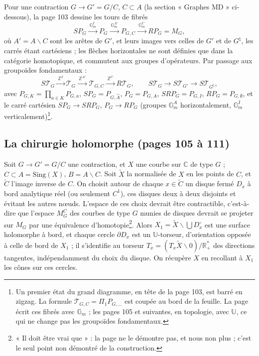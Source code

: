 \documentclass[11pt,a4paper]{article}
\begin{document}
Pour une contraction $G \to G' = G/C$, $C \subset A$ (la section « Graphes
MD » ci-dessous), la page 103 dessine les tours de fibrés
\[
SP_G \xrightarrow{\ \mathbb{G}_m^{I}\ } P_G \xrightarrow{\ \mathbb{G}_m^{A'}\ }
P_{G,C} \xrightarrow{\ \mathbb{G}_m^{C}\ } RP_G = M_G,
\]
où $A' = A \smallsetminus C$ sont les arêtes de $G'$, et leurs images vers
celles de $G'$ et de $G^{\natural}$, les carrés étant cartésiens ; les flèches
horizontales ne sont définies que dans la catégorie homotopique, et commutent
aux groupes d'opérateurs. Par passage aux groupoïdes fondamentaux :
\[
S\mathcal{T}_G \xrightarrow{\ \mathbb{Z}^{I}\ } \mathcal{T}_G
\xrightarrow{\ \mathbb{Z}^{A'}\ } \mathcal{T}_{G,C} \xrightarrow{\
\mathbb{Z}^{C}\ } R\mathcal{T}_G, \qquad S\mathcal{T}_G \to S\mathcal{T}_{G'}
\to S\mathcal{T}_{G^\natural},
\]
avec $P_{G,K} = \prod_{a \in K} P_{G,a}$, $SP_G = P_{G,\hat A}$, $P_G =
P_{G,A}$, $SRP_G = P_{G,I}$, $RP_G = P_{G,\emptyset}$, et le carré cartésien
$SP_G \to SRP_G$, $P_G \to RP_G$ (groupes $\mathbb{G}_m^{A}$ horizontalement,
$\mathbb{G}_m^{I}$ verticalement)\footnote{Un premier état du grand diagramme,
en tête de la page 103, est barré en zigzag. La formule
$\mathcal{T}_{G,C} = \Pi_1 P_{G,\ldots}$ est coupée au bord de la feuille. La
page écrit ces fibrés avec $\mathbb{G}_m$ ; les pages 105 et suivantes, en
topologie, avec $\mathbb{U}$, ce qui ne change pas les groupoïdes
fondamentaux.}.

\subsection*{La chirurgie holomorphe (pages 105 à 111)}

Soit $G \to G' = G/C$ une contraction, et $X$ une courbe sur $\mathbb{C}$ de
type $G$ ; $C \subset A = \mathrm{Sing}(X)$, $B = A \smallsetminus C$. Soit
$\widetilde{X}$ la normalisée de $X$ en les points de $C$, et $\widetilde{C}$
l'image inverse de $C$. On choisit autour de chaque $x \in \widetilde{C}$ un
disque fermé $D_x$ à bord analytique réel (ou seulement $C^1$), ces disques
deux à deux disjoints et évitant les autres nœuds. L'espace de ces choix
devrait être contractible, c'est-à-dire que l'espace $M^C_G$ des courbes de
type $G$ munies de disques devrait se projeter sur $M_G$ par une équivalence
d'homotopie\footnote{« Il doit être vrai que » : la page ne le démontre pas,
et nous non plus ; c'est le seul point non démontré de la construction.}.
Alors $X_1 = \widetilde{X} \smallsetminus \bigcup D_x^{\circ}$ est une
surface holomorphe à bord, et chaque cercle $\partial D_x$ est un
$\mathbb{U}$-torseur, d'orientation opposée à celle de bord de $X_1$ ; il
s'identifie au torseur $T_x = (T_x\widetilde{X} \smallsetminus
0)/\mathbb{R}^{*}_{+}$ des directions tangentes, indépendamment du choix du
disque. On récupère $X$ en recollant à $X_1$ les cônes sur ces cercles.
\end{document}
